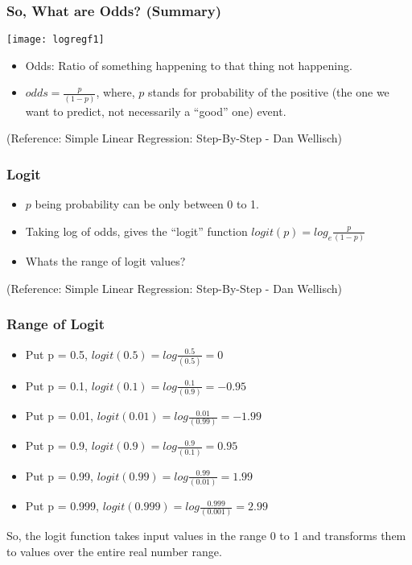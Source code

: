 \begin{frame}[fragile]\frametitle{So, What are Odds? (Summary)}
\begin{center}
\texttt{[image: logregf1]}
\end{center}

 \begin{itemize}
\item Odds: Ratio of something happening to that thing not happening.
\item $odds = \frac{p}{(1-p)}$, where, $p$ stands for probability of the positive (the one we want to predict, not necessarily a ``good'' one) event. %
\end{itemize}
\tiny{(Reference: Simple Linear Regression: Step-By-Step - Dan Wellisch)}
\end{frame}


\begin{frame}[fragile]\frametitle{Logit}
\begin{itemize}
\item $p$ being probability can be only between 0 to 1.%
\item Taking log of odds, gives the ``logit'' function $logit(p) = log_e \frac{p}{(1-p)}$
\item Whats the range of logit values?
\end{itemize}
\tiny{(Reference: Simple Linear Regression: Step-By-Step - Dan Wellisch)}
\end{frame}


\begin{frame}[fragile]\frametitle{Range of Logit}
 \begin{itemize}
\item Put p = 0.5, $logit(0.5) = log \frac{0.5}{(0.5)} = 0$
\item Put p = 0.1, $logit(0.1) = log \frac{0.1}{(0.9)} = -0.95$
\item Put p = 0.01, $logit(0.01) = log \frac{0.01}{(0.99)} = -1.99$
\item Put p = 0.9, $logit(0.9) = log \frac{0.9}{(0.1)} = 0.95$
\item Put p = 0.99, $logit(0.99) = log \frac{0.99}{(0.01)} = 1.99$
\item Put p = 0.999, $logit(0.999) = log \frac{0.999}{(0.001)} = 2.99$
\end{itemize}
So, the logit function takes input values in the range 0 to 1 and transforms them to 
values over the entire real number range.
\end{frame}


